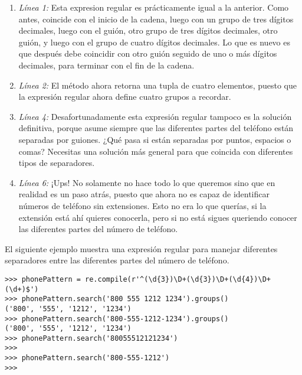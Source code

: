 \begin{enumerate}

\item \emph{Línea 1:} Esta expresion regular es prácticamente igual a la anterior. Como antes, coincide con el inicio de la cadena, luego con un grupo de tres dígitos decimales, luego con el guión, otro grupo de tres dígitos decimales, otro guión, y luego con el grupo de cuatro dígitos decimales. Lo que es nuevo es que después debe coincidir con otro guión seguido de uno o más dígitos decimales, para terminar con el fin de la cadena.

\item \emph{Línea 2:} El método  ahora retorna una tupla de cuatro elementos, puesto que la expresión regular ahora define cuatro grupos a recordar.

\item \emph{Línea 4:} Desafortunadamente esta expresión regular tampoco es la solución definitiva, porque asume siempre que las diferentes partes del teléfono están separadas por guiones. ¿Qué pasa si están separadas por puntos, espacios o comas? Necesitas una solución más general para que coincida con diferentes tipos de separadores.

\item \emph{Línea 6:} ¡Ups! No solamente no hace todo lo que queremos sino que en realidad es un paso atrás, puesto que ahora no es capaz de identificar números de teléfono sin extensiones. Esto no era lo que querías, si la extensión está ahí quieres conocerla, pero si no está sigues queriendo conocer las diferentes partes del número de teléfono.

\end{enumerate}

El siguiente ejemplo muestra una expresión regular para manejar diferentes separadores entre las diferentes partes del número de teléfono.

\noindent\begin{minipage}{\textwidth}
\begin{lstlisting}[mathescape=False]
>>> phonePattern = re.compile(r'^(\d{3})\D+(\d{3})\D+(\d{4})\D+(\d+)$')
>>> phonePattern.search('800 555 1212 1234').groups()
('800', '555', '1212', '1234')
>>> phonePattern.search('800-555-1212-1234').groups()
('800', '555', '1212', '1234')
>>> phonePattern.search('80055512121234')
>>> 
>>> phonePattern.search('800-555-1212')
>>> 
\end{lstlisting}
\end{minipage}

